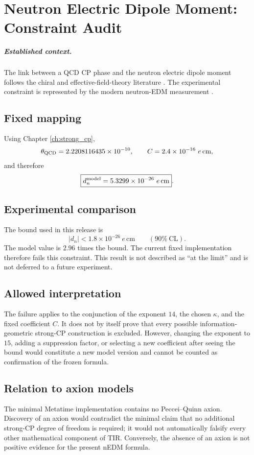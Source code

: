 \chapter{Neutron Electric Dipole Moment: Constraint Audit}
\label{ch:neutron_edm}

\paragraph{Established context.}
The link between a QCD CP phase and the neutron electric dipole moment follows
the chiral and effective-field-theory literature
\cite{crewther1979,pospelov2005}.  The experimental constraint is represented by
the modern neutron-EDM measurement \cite{Abel2020nEDM}.


\section{Fixed mapping}
Using Chapter \ref{ch:strong_cp},
\[
  \theta_{\rm QCD}=2.2208116435\times10^{-10},
  \qquad
  C=2.4\times10^{-16}\ e\,\mathrm{cm},
\]
and therefore
\[
  \boxed{d_n^{\rm model}=5.3299\times10^{-26}\ e\,\mathrm{cm}}.
\]

\section{Experimental comparison}
The bound used in this release is
\[
  |d_n|<1.8\times10^{-26}\ e\,\mathrm{cm}\qquad(90\%\ \mathrm{CL}).
\]
The model value is $2.96$ times the bound.  The current fixed implementation
therefore fails this constraint.  This result is not described as ``at the
limit'' and is not deferred to a future experiment.

\section{Allowed interpretation}
The failure applies to the conjunction of the exponent $14$, the chosen
$\kappa$, and the fixed coefficient $C$.  It does not by itself prove that every
possible information-geometric strong-CP construction is excluded.  However,
changing the exponent to $15$, adding a suppression factor, or selecting a new
coefficient after seeing the bound would constitute a new model version and
cannot be counted as confirmation of the frozen formula.

\section{Relation to axion models}
The minimal Metatime implementation contains no Peccei--Quinn axion.  Discovery
of an axion would contradict the minimal claim that no additional strong-CP
degree of freedom is required; it would not automatically falsify every other
mathematical component of TIR.  Conversely, the absence of an axion is not
positive evidence for the present nEDM formula.
